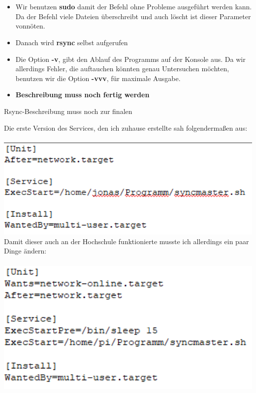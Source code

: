 \documentclass{article}
\begin{document}
\\\\
\begin{itemize}  
\item Wir benutzen \textbf{sudo} damit der Befehl ohne Probleme ausgeführt werden kann. Da der Befehl viele Dateien überschreibt und auch löscht ist dieser Parameter vonnöten.
\item Danach wird \textbf{rsync} selbst aufgerufen
\item Die Option \textbf{-v}, gibt den Ablauf des Programms auf der Konsole aus. Da wir allerdings Fehler, die auftauchen könnten genau Untersuchen möchten, benutzen wir die Option \textbf{-vvv}, für maximale Ausgabe.
\item \textbf{Beschreibung muss noch fertig werden}
\end{itemize}

Rsync-Beschreibung  muss noch zur finalen 

Die erste Version des Services, den ich zuhause erstellte sah folgendermaßen aus:
\\\\
\includegraphics[width=1.0\textwidth]{servicev1.png}
Damit dieser auch an der Hochschule funktionierte musste ich allerdings ein paar Dinge ändern:
\\\\
\includegraphics[width=1.0\textwidth]{servicev2.png}
\end{document}
